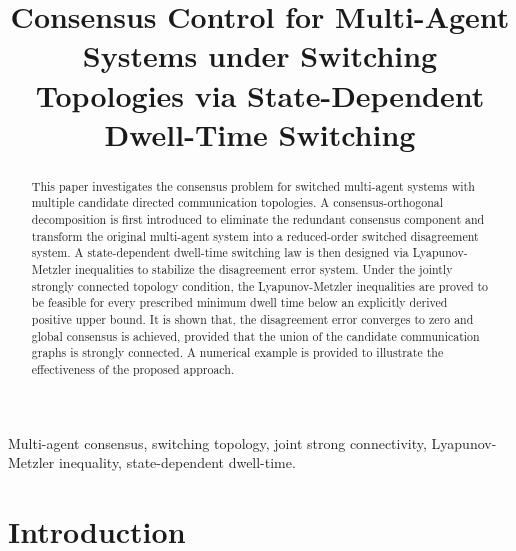 \documentclass[conference]{IEEEtran}
\begin{document}
	
	\title{Consensus Control for Multi-Agent Systems under Switching Topologies via State-Dependent Dwell-Time Switching}
	
	\author{
		\and
		}
	
	\maketitle
	
	\begin{abstract}
		This paper investigates the consensus problem for switched multi-agent systems with multiple candidate directed communication topologies. A consensus-orthogonal decomposition is first introduced to eliminate the redundant consensus component and transform the original multi-agent system into a reduced-order switched disagreement system. A state-dependent dwell-time switching law is then designed via Lyapunov-Metzler inequalities to stabilize the disagreement error system. Under the jointly strongly connected topology condition, the Lyapunov-Metzler inequalities are proved to be feasible for every prescribed minimum dwell time below an explicitly derived positive upper bound. It is shown that, the disagreement error converges to zero and global consensus is achieved, provided that the union of the candidate communication graphs is strongly connected. A numerical example is provided to illustrate the effectiveness of the proposed approach.
	\end{abstract}
	
	\begin{IEEEkeywords}
		Multi-agent consensus, switching topology, joint strong connectivity, Lyapunov-Metzler inequality, state-dependent dwell-time.
	\end{IEEEkeywords}
	
	\section{Introduction}
	
\end{document}
